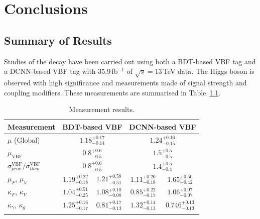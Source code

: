 \chapter{Conclusions}
\label{chap:conclusions}

\section{Summary of Results}
Studies of the \Hgg decay have been carried out using both a BDT-based VBF tag and a DCNN-based VBF tag with 35.9\,fb$^{-1}$ of $\sqrt{s}=13$\,TeV data. 
The Higgs boson is observed with high significance and measurements made of signal strength and coupling modifiers. 
These measurements are summarised in Table~\ref{tab:conclusion:measurements}.
\begin{table}[h!]
    \centering
    \renewcommand{\arraystretch}{1.5}
    \begin{tabular}{ l | c c c c}
        \thickhline
        Measurement & \multicolumn{2}{c}{BDT-based VBF}  & \multicolumn{2}{c}{DCNN-based VBF} \\
        \hline
        $\mu$ (Global)                  & \multicolumn{2}{c}{$1.18^{+0.17}_{-0.14}$} & \multicolumn{2}{c}{$1.24^{+0.16}_{-0.15}$} \\
        $\mu_{\mathrm{VBF}} $           & \multicolumn{2}{c}{$0.8^{+0.6}_{-0.5}$} & \multicolumn{2}{c}{$1.5^{+0.5}_{-0.5}$} \\
        $\sigma^{\mathrm{VBF}}_{proc}/\sigma^{\mathrm{VBF}}_{theo}$ & \multicolumn{2}{c}{$0.8^{+0.6}_{-0.5}$} & \multicolumn{2}{c}{$1.4^{+0.5}_{-0.4}$} \\  
        $\mu_F$, $\mu_V$                & $1.19^{+0.22}_{-0.18}$ & $1.21^{+0.58}_{-0.51}$ & $1.11^{+0.20}_{-0.18}$ & $1.65^{+0.50}_{-0.42}$ \\
        $\kappa_F$, $\kappa_V$          & $1.04^{+0.51}_{-0.25}$ & $1.08^{+0.10}_{-0.08}$ & $0.85^{+0.22}_{-0.17}$ & $1.06^{+0.07}_{-0.07}$ \\ 
        $\kappa_{\gamma}$, $\kappa_{g}$ & $1.25^{+0.16}_{-0.17}$ & $0.81^{+0.17}_{-0.13}$ & $1.32^{+0.14}_{-0.13}$ & $0.746^{+0.13}_{-0.13}$ \\ 
        \thickhline
\end{tabular}
    \caption{Measurement results.}
    \label{tab:conclusion:measurements}
\end{table}


